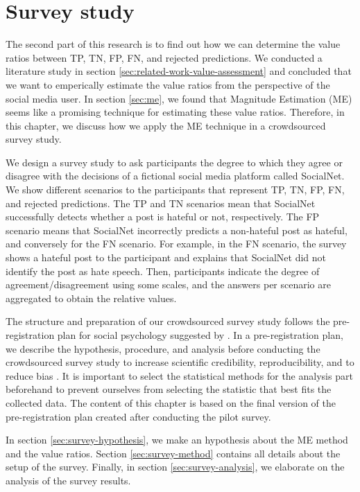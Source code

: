 \chapter{Survey study}
\label{sec:survey}
The second part of this research is to find out how we can determine the value ratios between TP, TN, FP, FN, and rejected predictions.
%
We conducted a literature study in section \ref{sec:related-work-value-assessment} and concluded that we want to emperically estimate the value ratios from the perspective of the social media user.
%
In section \ref{sec:me}, we found that Magnitude Estimation (ME) seems like a promising technique for estimating these value ratios.
%
Therefore, in this chapter, we discuss how we apply the ME technique in a crowdsourced survey study.
%

%
We design a survey study to ask participants the degree to which they agree or disagree with the decisions of a fictional social media platform called SocialNet.
%
We show different scenarios to the participants that represent TP, TN, FP, FN, and rejected predictions.
%
The TP and TN scenarios mean that SocialNet successfully detects whether a post is hateful or not, respectively.
%
The FP scenario means that SocialNet incorrectly predicts a non-hateful post as hateful, and conversely for the FN scenario.
%
For example, in the FN scenario, the survey shows a hateful post to the participant and explains that SocialNet did not identify the post as hate speech.
%
Then, participants indicate the degree of agreement/disagreement using some scales, and the answers per scenario are aggregated to obtain the relative values.
%

%
The structure and preparation of our crowdsourced survey study follows the pre-registration plan for social psychology suggested by \citet{van2016pre}.
%
In a pre-registration plan, we describe the hypothesis, procedure, and analysis before conducting the crowdsourced survey study to increase scientific credibility, reproducibility, and to reduce bias \citep{van2016pre}.
%
It is important to select the statistical methods for the analysis part beforehand to prevent ourselves from selecting the statistic that best fits the collected data.
%
The content of this chapter is based on the final version of the pre-registration plan created after conducting the pilot survey.
%

%
In section \ref{sec:survey-hypothesis}, we make an hypothesis about the ME method and the value ratios.
%
Section \ref{sec:survey-method} contains all details about the setup of the survey.
%
Finally, in section \ref{sec:survey-analysis}, we elaborate on the analysis of the survey results.

